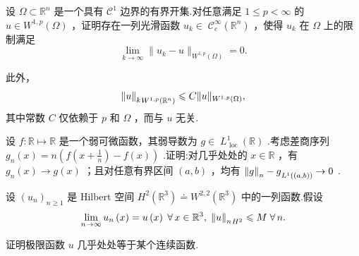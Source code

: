\begin{rbhw}
设 $\Omega  \subset  {\mathbb{R}}^{n}$ 是一个具有 ${\mathcal{C}}^{1}$ 边界的有界开集.对任意满足 $1 \leq  p < \infty$ 的 $u \in  {W}^{1,p}\left( \Omega \right)$ ，证明存在一列光滑函数 ${u}_{k} \in \; {\mathcal{C}}_{c}^{\infty }\left( {\mathbb{R}}^{n}\right)$ ，使得 ${u}_{k}$ 在 $\Omega$ 上的限制满足
\[
\mathop{\lim }\limits_{{k \rightarrow  \infty }}\| {u}_{k} - u{\| }_{{W}^{1,p}\left( \Omega \right) } = 0.
\]

此外，
\[
{\norm{u}_{k}}_{{W}^{1,p}\left( {\mathbb{R}}^{n}\right) } \leqslant  C\| u{\| }_{{W}^{1,p}\left( \Omega \right) },
\]
其中常数 $C$ 仅依赖于 $p$ 和 $\Omega$ ，而与 $u$ 无关.
\end{rbhw}

\begin{rbhw}
设 $f : \mathbb{R} \mapsto  \mathbb{R}$ 是一个弱可微函数，其弱导数为 $g \in \; {L}_{\text{ loc }}^{1}\left( \mathbb{R}\right)$ .考虑差商序列 ${g}_{n}\left( x\right)  = n\left(  {f\left( {x + \frac{1}{n}}\right)  - f\left( x\right) }\right)$ .证明:对几乎处处的 $x \in  \mathbb{R}$ ，有 ${g}_{n}\left( x\right)  \rightarrow  g\left( x\right)$ ；且对任意有界区间 $\left(  {a,b}\right)$ ，均有 ${\norm{g}_{n} - g}_{{L}^{1}\left( \left(  {a,b}\right)  \right) } \rightarrow  0$ .
\end{rbhw}

\begin{rbhw}
设 ${\left( {u}_{n}\right) }_{n \geq  1}$ 是 Hilbert 空间 ${H}^{2}\left( {\mathbb{R}}^{3}\right)  \doteq  {W}^{2,2}\left( {\mathbb{R}}^{3}\right)$ 中的一列函数.假设
\[
\mathop{\lim }\limits_{{n \rightarrow  \infty }}{u}_{n}\left( x\right)  = u\left( x\right) \;\forall\,x \in  {\mathbb{R}}^{3},\;{\norm{u}_{n}}_{{H}^{2}} \leqslant  M\;\forall\,n.
\]

证明极限函数 $u$ 几乎处处等于某个连续函数.
\end{rbhw}
